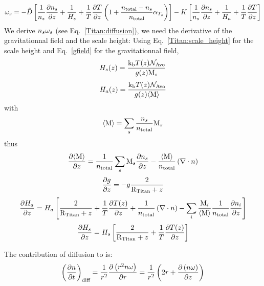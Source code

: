 \begin{equation}
\omega_s = -\tilde{D} 
                \left[
                      \frac{1}{n_s}\frac{\partial n_s}{\partial z} + \frac{1}{H_s} + 
                      \frac{1}{T}\frac{\partial T}{\partial z}\left(1 + \frac{n_\text{total} - n_s}{n_\text{total}}\alpha_{T_s}\right)
                \right] 
           - K 
                \left[
                     \frac{1}{n_s}\frac{\partial n_s}{\partial z} + \frac{1}{H_a} + \frac{1}{T}\frac{\partial T}{\partial z}
                \right]
\label{Titan:omega_diff}
\end{equation}
We derive $n_s\omega_s$ (see Eq.~\ref{Titan:diffusion}),
we need the derivative of the gravitationnal field and the scale height:
Using Eq.~\ref{Titan:scale_height} for the scale height and Eq.~\ref{gfield}
for the gravitationnal field,
\begin{equation}
H_s(z) = \frac{\text{k}_\text{b} T(z) \mathcal{N}_\text{Avo}}{g(z)\text{M}_s}
\label{Titan:scale_height_spec}
\end{equation}
\begin{equation}
H_a(z) = \frac{\text{k}_\text{b} T(z) \mathcal{N}_\text{Avo}}{g(z)\langle\text{M}\rangle}
\label{Titan:scale_height_atm}
\end{equation}
with
\begin{equation}
\langle\text{M}\rangle = \sum_s \frac{n_s}{n_\text{total}} \text{M}_s
\end{equation}
thus
\begin{equation}
\frac{\partial\langle\text{M}\rangle}{\partial z} =   \frac{1}{n_\text{total}}\sum_s \text{M}_s\frac{\partial n_s}{\partial z} - \frac{\langle\text{M}\rangle}{n_\text{total}}\left(\nabla\cdot{\ensuremath{n}}\right)
\end{equation}
\begin{equation}
\frac{\partial g}{\partial z} = -   g \frac{2}{\text{R}_\text{Titan} + z}
\end{equation}
\begin{equation}
\frac{\partial H_a}{\partial z} = H_a\left[ 
                       \frac{2}{\text{R}_\text{Titan} + z} 
                     + \frac{1}{T}\frac{\partial T(z)}{\partial z} 
                     + \frac{1}{n_\text{total}}\left(\nabla\cdot{\ensuremath{n}}\right)
                     - \sum_i\frac{\text{M}_i}{\langle\text{M}\rangle}\frac{1}{n_\text{total}}\frac{\partial n_i}{\partial z}
                       \right]
\end{equation}
\begin{equation}
\frac{\partial H_s}{\partial z} = H_s\left[\frac{2}{\text{R}_\text{Titan} + z} + \frac{1}{T}\frac{\partial T(z)}{\partial z}\right] 
\end{equation}

The contribution of diffusion to  is:
\begin{equation}
\left(\frac{\partial n}{\partial t}\right)_{\text{diff}} = \frac{1}{r^2}\frac{\partial\left(r^2n\omega\right)}{\partial r}
                                             = \frac{1}{r^2}\left(2 r + \frac{\partial\left(n\omega\right)}{\partial z}\right)
\label{Titan:diffusion}
\end{equation}

